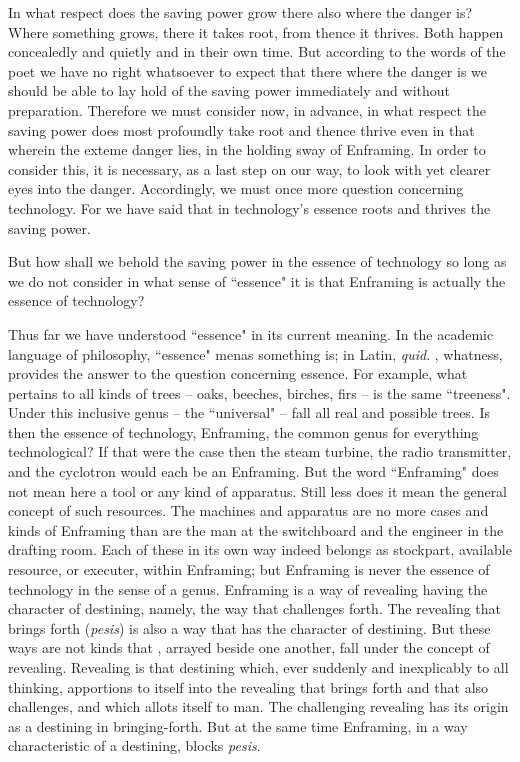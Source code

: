 In what respect does the saving power grow there also where the danger is? Where something grows, there it takes root, from thence it thrives. Both happen concealedly and quietly and in their own time. But according to the words of the poet we have no right whatsoever to expect that there where the danger is we should be able to lay hold of the saving power immediately and without preparation. Therefore we must consider now, in advance, in what respect the saving power does most profoundly take root and thence thrive even in that wherein the exteme danger lies, in the holding sway of Enframing. In order to consider this, it is necessary, as a last step on our way, to look with yet clearer eyes into the danger. Accordingly, we must once more question concerning technology. For we have said that in technology's essence roots and thrives the saving power.

But how shall we behold the saving power in the essence of technology so long as we do not consider in what sense of ``essence" it is that Enframing is actually the essence of technology?

Thus far we have understood ``essence" in its current meaning. In the academic language of philosophy, ``essence" menas  something is; in Latin, \textit{quid}. , whatness, provides the answer to the question concerning essence. For example, what pertains to all kinds of trees -- oaks, beeches, birches, firs -- is the same ``treeness". Under this inclusive genus -- the ``universal" -- fall all real and possible trees. Is then the essence of technology, Enframing, the common genus for everything technological? If that were the case then the steam turbine, the radio transmitter, and the cyclotron would each be an Enframing. But the word ``Enframing" does not mean here a tool or any kind of apparatus. Still less does it mean the general concept of such resources. The machines and apparatus are no more cases and kinds of Enframing than are the man at the switchboard and the engineer in the drafting room. Each of these in its own way indeed belongs as stockpart, available resource, or executer, within Enframing; but Enframing is never the essence of technology in the sense of a genus. Enframing is a way of revealing having the character of destining, namely, the way that challenges forth. The revealing that brings forth (\textit{pesis}) is also a way that has the character of destining. But these ways are not kinds that , arrayed beside one another, fall under the concept of revealing. Revealing is that destining which, ever suddenly and inexplicably to all thinking, apportions to itself into the revealing that brings forth and that also challenges, and which allots itself to man. The challenging revealing has its origin as a destining in bringing-forth. But at the same time Enframing, in a way characteristic of a destining, blocks \textit{pesis}.

